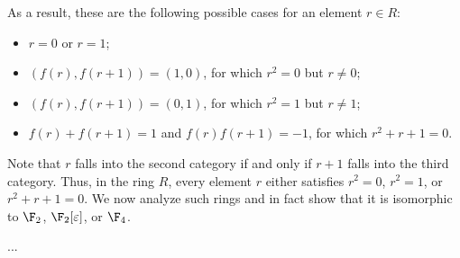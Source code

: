 As a result, these are the following possible cases for an element $r \in R$:
\begin{itemize}
    \item   $r = 0$ or $r = 1$;
    \item   $(f(r), f(r + 1)) = (1, 0)$, for which $r^2 = 0$ but $r \neq 0$;
    \item   $(f(r), f(r + 1)) = (0, 1)$, for which $r^2 = 1$ but $r \neq 1$;
    \item   $f(r) + f(r + 1) = 1$ and $f(r) f(r + 1) = -1$, for which $r^2 + r + 1 = 0$.
\end{itemize}

Note that $r$ falls into the second category if and only if $r + 1$ falls into the third category.
Thus, in the ring $R$, every element $r$ either satisfies $r^2 = 0$, $r^2 = 1$, or $r^2 + r + 1 = 0$.
We now analyze such rings and in fact show that it is isomorphic to $\F_2$, $\F_2[\varepsilon]$, or $\F_4$.

...

